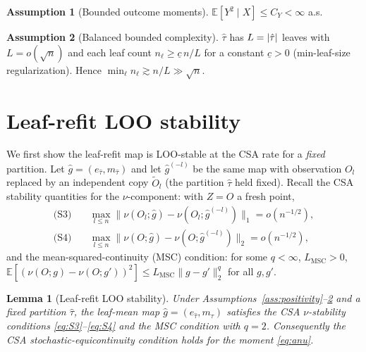 \documentclass[11pt]{article}
\theoremstyle{plain}
\newtheorem{lemma}{Lemma}
\theoremstyle{definition}
\newtheorem{assumption}{Assumption}
\theoremstyle{remark}
\newcommand{\E}{\mathbb{E}}
\newcommand{\Ltwo}[1]{\lVert #1 \rVert_{2}}
\DeclarePairedDelimiter{\abs}{\lvert}{\rvert}
\newcommand{\eT}{e_{\hat\tau}}
\newcommand{\mT}{m_{\hat\tau}}
\newcommand{\Ghat}{\hat g}
\newcommand{\odiff}{o}
\begin{document}
\begin{assumption}[Bounded outcome moments]\label{ass:moments}
$\E[Y^2\mid X]\le C_Y<\infty$ a.s.
\end{assumption}

\begin{assumption}[Balanced bounded complexity]\label{ass:leaves}
$\hat\tau$ has $L=\abs{\hat\tau}$ leaves with $L=\odiff(\sqrt n)$ and each leaf
count $n_\ell\ge \underline{c}\,n/L$ for a constant $\underline{c}>0$
(min-leaf-size regularization). Hence $\min_\ell n_\ell\gtrsim n/L\gg\sqrt n$.
\end{assumption}

\section{Leaf-refit LOO stability}\label{sec:leaf}

We first show the leaf-refit map is LOO-stable at the CSA rate for a
\emph{fixed} partition. Let $\Ghat=(\eT,\mT)$ and let $\Ghat^{(-l)}$ be the same
map with observation $O_l$ replaced by an independent copy $\tilde O_l$ (the
partition $\hat\tau$ held fixed). Recall the CSA stability quantities for the
$\nu$-component: with $Z=O$ a fresh point,
\begin{align}
  \text{(S3)}\quad & \max_{l\le n}\bigl\lVert \nu(O_l;\Ghat)-\nu(O_l;\Ghat^{(-l)})\bigr\rVert_1=\odiff(n^{-1/2}),\label{eq:S3}\\
  \text{(S4)}\quad & \max_{l\le n}\bigl\lVert \nu(O;\Ghat)-\nu(O;\Ghat^{(-l)})\bigr\rVert_2=\odiff(n^{-1/2}),\label{eq:S4}
\end{align}
and the mean-squared-continuity (MSC) condition: for some $q<\infty$, $L_{\mathrm{MSC}}>0$,
$\E[(\nu(O;g)-\nu(O;g'))^2]\le L_{\mathrm{MSC}}\Ltwo{g-g'}^{q}$ for all $g,g'$.

\begin{lemma}[Leaf-refit LOO stability]\label{lem:leafstab}
Under Assumptions~\ref{ass:positivity}--\ref{ass:leaves} and a \emph{fixed}
partition $\hat\tau$, the leaf-mean map $\Ghat=(\eT,\mT)$ satisfies the CSA
$\nu$-stability conditions \eqref{eq:S3}--\eqref{eq:S4} and the MSC condition with
$q=2$. Consequently the CSA stochastic-equicontinuity condition holds for the
moment \eqref{eq:anu}.
\end{lemma}
\end{document}
